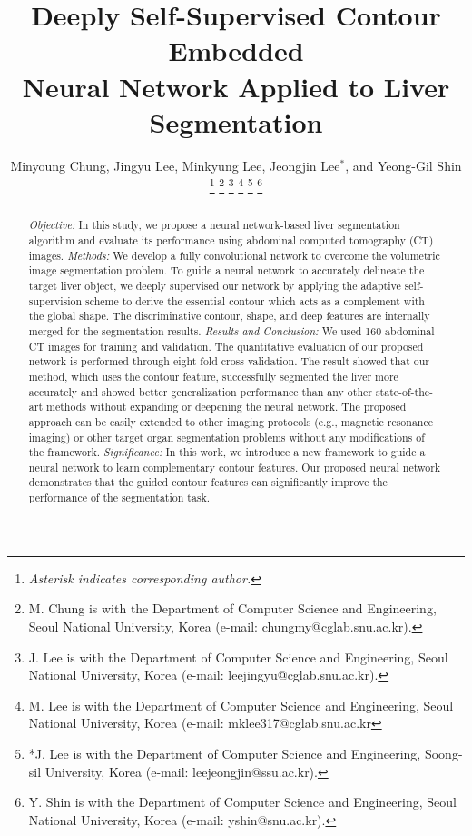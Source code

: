 \documentclass[journal]{IEEEtran}
\begin{document}
\title{Deeply Self-Supervised Contour Embedded\\ Neural Network Applied to Liver Segmentation}
\author{Minyoung Chung, Jingyu Lee, Minkyung Lee, Jeongjin Lee$^{\ast}$, and Yeong-Gil Shin%
\thanks{\textit{Asterisk indicates corresponding author.}}%
\thanks{M. Chung is with the Department of Computer Science and Engineering, Seoul National University, Korea (e-mail: chungmy@cglab.snu.ac.kr).}%
\thanks{J. Lee is with the Department of Computer Science and Engineering, Seoul National University, Korea (e-mail: leejingyu@cglab.snu.ac.kr).}%
\thanks{M. Lee is with the Department of Computer Science and Engineering, Seoul National University, Korea (e-mail: mklee317@cglab.snu.ac.kr}%
\thanks{*J. Lee is with the Department of Computer Science and Engineering, Soong-sil University, Korea (e-mail: leejeongjin@ssu.ac.kr).}%
\thanks{Y. Shin is with the Department of Computer Science and Engineering, Seoul National University, Korea (e-mail: yshin@snu.ac.kr).}}



\maketitle

\begin{abstract}
\textit{Objective:} In this study, we propose a neural network-based liver segmentation algorithm and evaluate its performance using abdominal computed tomography (CT) images. 
\textit{Methods:} We develop a fully convolutional network to overcome the volumetric image segmentation problem. To guide a neural network to accurately delineate the target liver object, we deeply supervised our network by applying the adaptive self-supervision scheme to derive the essential contour which acts as a complement with the global shape. The discriminative contour, shape, and deep features are internally merged for the segmentation results. 
\textit{Results and Conclusion:} We used 160 abdominal CT images for training and validation. The quantitative evaluation of our proposed network is performed through eight-fold cross-validation. The result showed that our method, which uses the contour feature, successfully segmented the liver more accurately and showed better generalization performance than any other state-of-the-art methods without expanding or deepening the neural network. The proposed approach can be easily extended to other imaging protocols (e.g., magnetic resonance imaging) or other target organ segmentation problems without any modifications of the framework.
\textit{Significance:} In this work, we introduce a new framework to guide a neural network to learn complementary contour features. Our proposed neural network demonstrates that the guided contour features can significantly improve the performance of the segmentation task.


\end{abstract}
\end{document}
